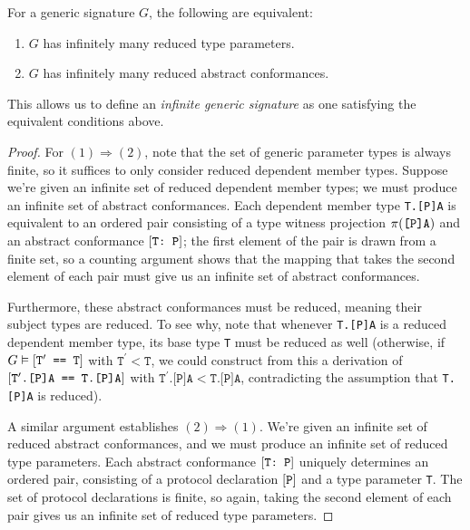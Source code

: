 \documentclass[../generics]{subfiles}
\begin{document}
\begin{proposition}\label{infinite signature lemma} For a generic signature $G$, the following are equivalent:
\begin{enumerate}
\item $G$ has infinitely many reduced type parameters.
\item $G$ has infinitely many reduced abstract conformances.
\end{enumerate}
This allows us to define an \emph{infinite generic signature} as one satisfying the equivalent conditions above.
\end{proposition}
\begin{proof}
For $(1)\Rightarrow(2)$, note that the set of generic parameter types is always finite, so it suffices to only consider reduced dependent member types. Suppose we're given an infinite set of reduced dependent member types; we must produce an infinite set of abstract conformances. Each dependent member type \texttt{T.[P]A} is equivalent to an ordered pair consisting of a type witness projection $\pi(\texttt{[P]A})$ and an abstract conformance $[\texttt{T:~P}]$; the first element of the pair is drawn from a finite set, so a counting argument shows that the mapping that takes the second element of each pair must give us an infinite set of abstract conformances.

Furthermore, these abstract conformances must be reduced, meaning their subject types are reduced. To see why, note that whenever \texttt{T.[P]A} is a reduced dependent member type, its base type \texttt{T} must be reduced as well (otherwise, if $G\vDash[\texttt{$\texttt{T}^\prime$ == T}]$ with $\texttt{T}^\prime<\texttt{T}$, we could construct from this a derivation of $[\texttt{$\texttt{T}^\prime$.[P]A == T.[P]A}]$ with $\texttt{$\texttt{T}^\prime$.[P]A} < \texttt{T.[P]A}$, contradicting the assumption that \texttt{T.[P]A} is reduced).

A similar argument establishes $(2)\Rightarrow(1)$. We're given an infinite set of reduced abstract conformances, and we must produce an infinite set of reduced type parameters. Each abstract conformance $[\texttt{T:~P}]$ uniquely determines an ordered pair, consisting of a protocol declaration $[\texttt{P}]$ and a type parameter \texttt{T}. The set of protocol declarations is finite, so again, taking the second element of each pair gives us an infinite set of reduced type parameters.
\end{proof}
\end{document}
